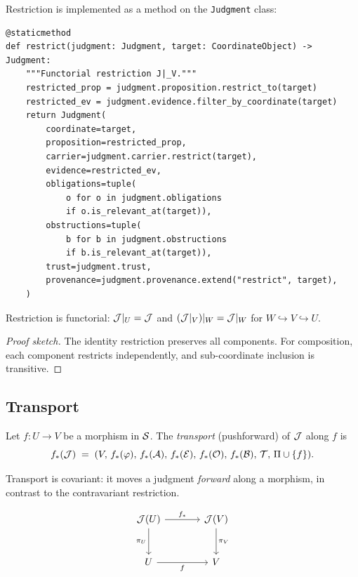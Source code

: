 \documentclass[11pt]{article}
\begin{document}
Restriction is implemented as a method on the \texttt{Judgment} class:
\begin{lstlisting}[caption={Restriction in \texttt{JudgmentAlgebra}.}]
@staticmethod
def restrict(judgment: Judgment, target: CoordinateObject) -> Judgment:
    """Functorial restriction J|_V."""
    restricted_prop = judgment.proposition.restrict_to(target)
    restricted_ev = judgment.evidence.filter_by_coordinate(target)
    return Judgment(
        coordinate=target,
        proposition=restricted_prop,
        carrier=judgment.carrier.restrict(target),
        evidence=restricted_ev,
        obligations=tuple(
            o for o in judgment.obligations
            if o.is_relevant_at(target)),
        obstructions=tuple(
            b for b in judgment.obstructions
            if b.is_relevant_at(target)),
        trust=judgment.trust,
        provenance=judgment.provenance.extend("restrict", target),
    )
\end{lstlisting}

\begin{proposition}\label{prop:restrict-func}
Restriction is functorial: $\mathcal{J}|_U = \mathcal{J}$ and
$(\mathcal{J}|_V)|_W = \mathcal{J}|_W$ for $W \hookrightarrow V \hookrightarrow U$.
\end{proposition}

\begin{proof}[Proof sketch]
The identity restriction preserves all components.  For composition,
each component restricts independently, and sub-coordinate inclusion is
transitive.
\end{proof}

\subsection{Transport}\label{ssec:transport}

\begin{definition}[Transport]
Let $f : U \to V$ be a morphism in $\mathcal{S}$.  The \emph{transport} (pushforward)
of $\mathcal{J}$ along $f$ is
\[
  f_*(\mathcal{J}) \;=\; (V,\,f_*(\varphi),\,f_*(\mathcal{A}),\,f_*(\mathcal{E}),\,f_*(\mathcal{O}),\,f_*(\mathcal{B}),\,\mathcal{T},\,\Pi \cup \{f\}).
\]
\end{definition}

Transport is covariant: it moves a judgment \emph{forward} along a
morphism, in contrast to the contravariant restriction.

\begin{equation}\label{eq:transport}
\begin{tikzcd}[column sep=large, row sep=large]
  \J(U) \arrow[r, "f_*"] \arrow[d, "\pi_U"'] & \J(V) \arrow[d, "\pi_V"] \\
  U \arrow[r, "f"'] & V
\end{tikzcd}
\end{equation}
\end{document}
